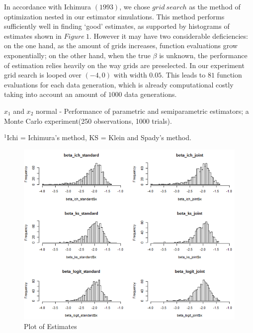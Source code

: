 \documentclass[a4paper]{article}
\begin{document}
In accordance with Ichimura $(1993)$, we chose $grid\ search$ as the method of optimization nested in our estimator simulations. This method performs sufficiently well in finding `good' estimates, as supported by histograms of estimates shown in $Figure\ 1$. However it may have two considerable deficiencies: on the one hand, as the amount of grids increases, function evaluations grow exponentially; on the other hand, when the true $\beta$ is unknown, the performance of estimation relies heavily on the way grids are preselected. In our experiment grid search is looped over $(-4,0)$ with width $0.05$. This leads to $81$ function evaluations for each data generation, which is already computational costly taking into account an amount of $1000$ data generations.

\begin{table}[H]
\caption {Bias and Root Mean Squared Error Comparison} \label{tab:bias and mean squared error}

$x_1$ and $x_2$ normal - Performance of parametric and semiparametric estimators; a Monte Carlo experiment(250 observations, 1000 trials).
\centering
{}

$^1$Ichi = Ichimura's method, KS = Klein and Spady's method.

\end{table}

\begin{figure}[h!]
  \caption{Plot of Estimates}
  \includegraphics[width=\linewidth]{plot_comparison.png}
 
  \label{fig:plot of estimates}
\end{figure}
\end{document}
